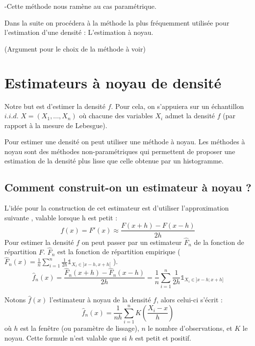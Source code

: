 \documentclass[
]{book}
\begin{document}
\begin{rem}
-Cette méthode nous ramène au cas paramétrique.\newline
\end{rem}

Dans la suite on procédera à la méthode la plus fréquemment utilisée pour l'estimation d'une densité : L'estimation à noyau.\newline 

(Argument pour le choix de la méthode à voir)

\hypertarget{estimateurs-uxe0-noyau-de-densituxe9}{%
\section{Estimateurs à noyau de densité}\label{estimateurs-uxe0-noyau-de-densituxe9}}

Notre but est d'estimer la densité \(f\). Pour cela, on s'appuiera sur un échantillon \(i.i.d.\) \(X= (X_1,...,X_n)\) où chacune des variables \(X_i\) admet la densité \(f\) (par rapport à la mesure de Lebesgue).

Pour estimer une densité on peut utiliser une méthode à noyau.
Les méthodes à noyau sont des méthodes non-paramétriques qui permettent de proposer une estimation de la densité plus lisse que celle obtenue par un histogramme.

\hypertarget{comment-construit-on-un-estimateur-uxe0-noyau}{%
\subsection{Comment construit-on un estimateur à noyau ?}\label{comment-construit-on-un-estimateur-uxe0-noyau}}

L'idée pour la construction de cet estimateur est d'utiliser l'approximation suivante , valable lorsque h est petit :\\
\[
f(x) = F'(x)\approx \frac{F(x+h)-F(x-h)}{2h}
\]
Pour estimer la densité \(f\) on peut passer par un estimateur \(\hat F_n\) de la fonction de répartition \(F\). \(\hat F_n\) est la fonction de répartition empirique ( \(\hat F_n(x)= \frac1n \sum\limits_{i=1}^n\frac{1}{2h} \mathds1_{X_i \in ]x-h, x+h[}\) ).
\[
\hat f_n(x)= \frac{\hat F_n(x+h)-\hat F_n(x-h)}{2h} = \frac 1n \sum\limits_{i=1}^n \frac1{2h} \mathds1_{X_i \in ]x-h;x+h]}
\]

Notons \(\hat f(x)\) l'estimateur à noyau de la densité \(f\), alors celui-ci s'écrit :
\[
\hat f_n(x) = \frac1{nh} \sum\limits_{i=1}^n K\left(\frac{X_i-x}h\right)
\]
où \(h\) est la fenêtre (ou paramètre de lissage), \(n\) le nombre d'observations, et \(K\) le noyau.
Cette formule n'est valable que si \(h\) est petit et positif.
\end{document}
